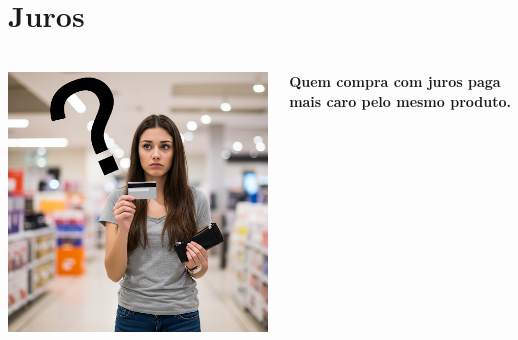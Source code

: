 \section{Juros} \label{FormProb}


\begin{frame}[c]
    \frametitle{}
    \begin{columns}
        \begin{column}{0.5\textwidth}
            \includegraphics[width=\textwidth]{../figuras/consumo3.png}
        \end{column}
        \begin{column}{0.5\textwidth}
            \centering
            \textbf{\Large Quem compra com juros paga mais caro pelo mesmo produto.}
        \end{column}
    \end{columns}
\end{frame}

